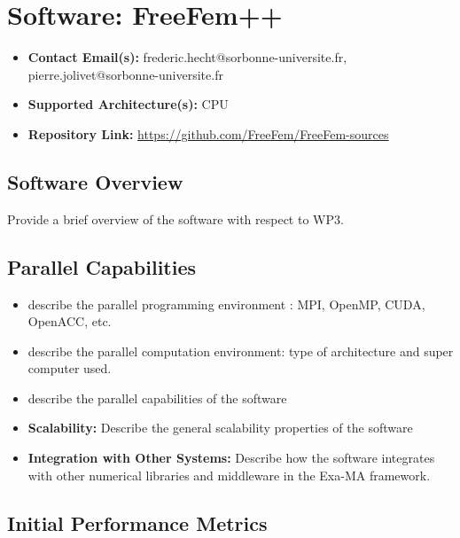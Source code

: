\section{Software: FreeFem++}
\label{sec:WP3:FreeFem++:software}

\begin{itemize}
    \item \textbf{Contact Email(s):} frederic.hecht@sorbonne-universite.fr, pierre.jolivet@sorbonne-universite.fr
    \item \textbf{Supported Architecture(s):} CPU
    \item \textbf{Repository Link:} \href{https://github.com/FreeFem/FreeFem-sources}{https://github.com/FreeFem/FreeFem-sources}
\end{itemize}

\subsection{Software Overview}
\label{sec:WP3:FreeFem++:summary}

Provide a brief overview of the software with respect to WP3.

\subsection{Parallel Capabilities}
\label{sec:WP3:FreeFem++:performances}


\begin{itemize}
    \item describe the parallel programming  environment : MPI, OpenMP, CUDA, OpenACC, etc.
    \item describe the parallel computation environment: type of architecture and super computer used.
    \item describe the parallel capabilities of the software
    \item \textbf{Scalability:} Describe the general scalability properties of the software
    \item \textbf{Integration with Other Systems:} Describe how the software integrates with other numerical libraries and middleware in the Exa-MA framework.
\end{itemize}

\subsection{Initial Performance Metrics}
\label{sec:WP3:FreeFem++:metrics}

